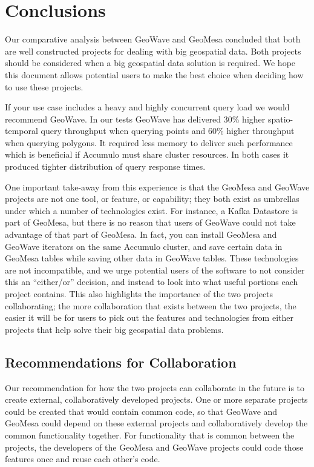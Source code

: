 \section{Conclusions}
\label{sec:conclusions}

Our comparative analysis between GeoWave and GeoMesa concluded that both are well constructed projects for dealing with big geospatial data.
Both projects should be considered when a big geospatial data solution is required.
We hope this document allows potential users to make the best choice when deciding how to use these projects.

If your use case includes a heavy and highly concurrent query load we would recommend GeoWave.
In our tests GeoWave has delivered $30$\% higher spatio-temporal query throughput when querying points and $60$\% higher throughput when querying polygons.
It required less memory to deliver such performance which is beneficial if Accumulo must share cluster resources.
In both cases it produced tighter distribution of query response times.

One important take-away from this experience is that the GeoMesa and GeoWave projects are not one tool, or feature, or capability; they both exist as umbrellas under which a number of technologies exist.
For instance, a Kafka Datastore is part of GeoMesa, but there is no reason that users of GeoWave could not take advantage of that part of GeoMesa.
In fact, you can install GeoMesa and GeoWave iterators on the same Accumulo cluster, and save certain data in GeoMesa tables while saving other data in GeoWave tables.
These technologies are not incompatible, and we urge potential users of the software to not consider this an ``either/or'' decision, and instead to look into what useful portions each project contains.
This also highlights the importance of the two projects collaborating; the more collaboration that exists between the two projects, the easier it will be for users to pick out the features and technologies from either projects that help solve their big geospatial data problems.


\subsection{Recommendations for Collaboration}
\label{sec:conclusions:collaboration}

Our recommendation for how the two projects can collaborate in the future is to create external, collaboratively developed projects.
One or more separate projects could be created that would contain common code, so that GeoWave and GeoMesa could depend on these external projects and collaboratively develop the common functionality together.
For functionality that is common between the projects, the developers of the GeoMesa and GeoWave projects could code those features once and reuse each other's code.

